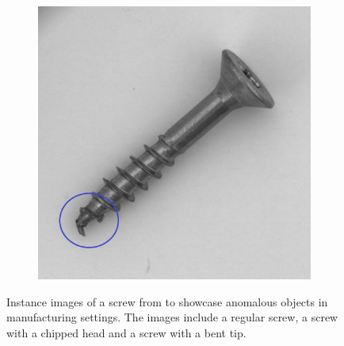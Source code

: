 \begin{figure}[htbp]
\begin{subfigure}[b]{0.28\textwidth}
    \end{subfigure}
    \hspace{0.05\textwidth} %
    \begin{subfigure}[b]{0.28\textwidth}
        \centering
        \includegraphics[width=\textwidth]{figures/introductionanomalies/realfrontnow.png}

    \end{subfigure}
    \caption{Instance images of a screw from \cite{MVTEC_Bergmann_2021} to showcase anomalous objects in manufacturing settings. The images include a regular screw, a screw with a chipped head and a screw with a bent tip.}
    \label{fig:introscrew}
\end{figure}